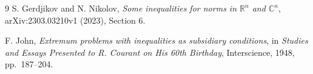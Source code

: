 \documentclass[11pt]{article}
\newcommand{\R}{\mathbb R}
\newcommand{\C}{\mathbb C}
\begin{document}
\begin{thebibliography}{9}
S. Gerdjikov and N. Nikolov,
\emph{Some inequalities for norms in $\R^n$ and $\C^n$},
arXiv:2303.03210v1 (2023), Section 6.

F. John,
\emph{Extremum problems with inequalities as subsidiary conditions},
in \emph{Studies and Essays Presented to R. Courant on His 60th Birthday},
Interscience, 1948, pp.~187--204.
\end{thebibliography}
\end{document}
